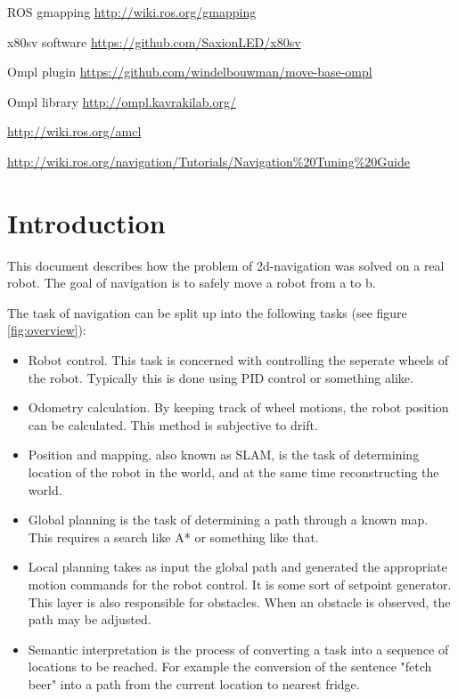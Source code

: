 \documentclass[a4paper]{article}
\begin{document}
\begin{thebibliography}{1}

   ROS gmapping \url{http://wiki.ros.org/gmapping}

   x80sv software \url{https://github.com/SaxionLED/x80sv}

   Ompl plugin
\url{https://github.com/windelbouwman/move-base-ompl}

   Ompl library \url{http://ompl.kavrakilab.org/}

   \url{http://wiki.ros.org/amcl}

   \url{http://wiki.ros.org/navigation/Tutorials/Navigation%20Tuning%20Guide}
\end{thebibliography}

\clearpage

\section{Introduction}

This document describes how the problem of 2d-navigation was solved on a real robot.
The goal of navigation is to safely move a robot from a to b.

The task of navigation can be split up into the following tasks (see figure \ref{fig:overview}):

\begin{itemize}
  \item Robot control. This task is concerned with controlling the seperate wheels of the robot.
  Typically this is done using PID control or something alike.
  \item Odometry calculation. By keeping track of wheel motions, the robot position can be
calculated. This method is subjective to drift.
  \item Position and mapping, also known as SLAM, is the task of determining location of the robot in 
  the world, and at the same time reconstructing the world.
  \item Global planning is the task of determining a path through a known map. This requires a search
  like A* or something like that.
  \item Local planning takes as input the global path and generated the appropriate motion commands for
  the robot control. It is some sort of setpoint generator. This layer is also responsible for obstacles.
  When an obstacle is observed, the path may be adjusted.
  \item Semantic interpretation is the process of converting a task into a sequence of locations to be
  reached. For example the conversion of the sentence "fetch beer" into a path from the current location
  to nearest fridge.
\end{itemize}
\end{document}
